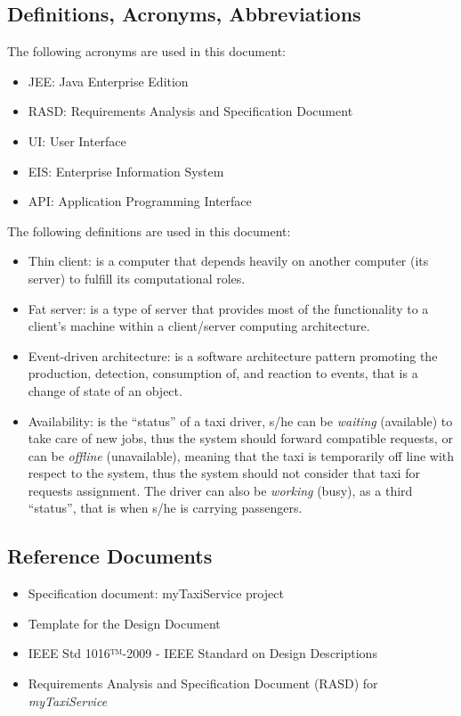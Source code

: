 \documentclass[a4paper,11pt]{report} %
\newcommand{\mts}{\mbox{\normalfont\itshape myTaxiService}}
\begin{document}
	\subsection{Definitions, Acronyms, Abbreviations}
	The following acronyms are used in this document:
	\begin{itemize}
		\item JEE: Java Enterprise Edition
		\item RASD: Requirements Analysis and Specification Document
		\item UI: User Interface
		\item EIS: Enterprise Information System
		\item API: Application Programming Interface
	\end{itemize}
	The following definitions are used in this document:
	\begin{itemize}
		\item Thin client: is a computer that depends heavily on another computer (its server) to fulfill its computational roles.
		\item Fat server: is a type of server that provides most of the functionality to a client's machine within a client/server computing architecture.
		\item Event-driven architecture:  is a software architecture pattern promoting the production, detection, consumption of, and reaction to events, that is a change of state of an object.
		\item Availability: is the ``status'' of a taxi driver, s/he can be \textit{waiting} (available) to take care of new jobs, thus the system should forward compatible requests, or can be \textit{offline} (unavailable), meaning that the taxi is temporarily off line with respect to the system, thus the system should not consider that taxi for requests assignment. The driver can also be \textit{working} (busy), as a third ``status'', that is when s/he is carrying passengers.
	\end{itemize}
	
	\subsection{Reference Documents}
	\begin{itemize}
		\item Specification document: myTaxiService project
		\item Template for the Design Document
		\item IEEE Std 1016™-2009 - IEEE Standard on Design Descriptions
		\item Requirements Analysis and Specification Document (RASD) for \mts{}
	\end{itemize}
	
\end{document}
